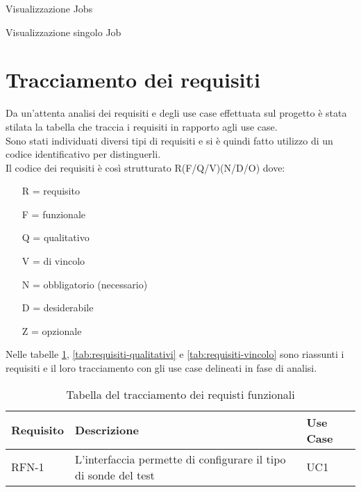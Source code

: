 \begin{usecase}{6}{Visualizzazione Jobs}
\label{uc:visualizzazione-jobs}
\end{usecase}

\begin{usecase}{7}{Visualizzazione singolo Job}
\label{uc:visualizzazione-job}
\end{usecase}

\section{Tracciamento dei requisiti}

Da un'attenta analisi dei requisiti e degli use case effettuata sul progetto è stata stilata la tabella che traccia i requisiti in rapporto agli use case.\\
Sono stati individuati diversi tipi di requisiti e si è quindi fatto utilizzo di un codice identificativo per distinguerli.\\
Il codice dei requisiti è così strutturato R(F/Q/V)(N/D/O) dove:
\begin{enumerate}
	\item[R =] requisito
    \item[F =] funzionale
    \item[Q =] qualitativo
    \item[V =] di vincolo
    \item[N =] obbligatorio (necessario)
    \item[D =] desiderabile
    \item[Z =] opzionale
\end{enumerate}
Nelle tabelle \ref{tab:requisiti-funzionali}, \ref{tab:requisiti-qualitativi} e \ref{tab:requisiti-vincolo} sono riassunti i requisiti e il loro tracciamento con gli use case delineati in fase di analisi.

\newpage

\begin{table}%
\caption{Tabella del tracciamento dei requisti funzionali}
\label{tab:requisiti-funzionali}
\begin{tabularx}{\textwidth}{lXl}
\hline\hline
\textbf{Requisito} & \textbf{Descrizione} & \textbf{Use Case}\\
\hline
RFN-1     & L'interfaccia permette di configurare il tipo di sonde del test & UC1 \\
\hline
\end{tabularx}
\end{table}%

